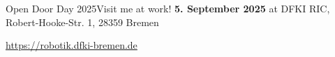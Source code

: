 \documentclass[aspectratio=169]{beamer}
\begin{document}

\begin{frame}{Open Door Day 2025}{Visit me at work!}
    \centering
    \textbf{5. September 2025} at DFKI RIC, Robert-Hooke-Str. 1, 28359 Bremen


    \url{https://robotik.dfki-bremen.de}
\end{frame}

  

\end{document}
